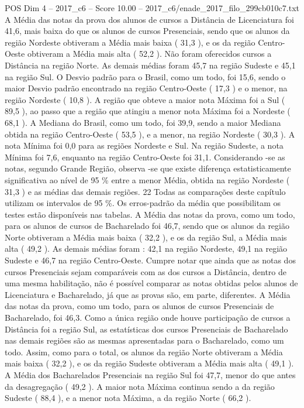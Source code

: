 \begin{textsample}{POS Dim 4 – 2017\_c6 – Score 10.00 – 2017\_c6/enade\_2017\_filo\_299cb010c7.txt}
A Média das notas da prova dos alunos de cursos a Distância de Licenciatura foi 41,6, mais baixa do que os alunos de cursos Presenciais, sendo que os alunos da região Nordeste obtiveram a Média mais baixa ( 31,3 ), e os da região Centro-Oeste obtiveram a Média mais alta ( 52,2 ).
Não foram oferecidos cursos a Distância na região Norte.
As demais médias foram 45,7 na região Sudeste e 45,1 na região Sul.
O Desvio padrão para o Brasil, como um todo, foi 15,6, sendo o maior Desvio padrão encontrado na região Centro-Oeste ( 17,3 ) e o menor, na região Nordeste ( 10,8 ).
A região que obteve a maior nota Máxima foi a Sul ( 89,5 ), ao passo que a região que atingiu a menor nota Máxima foi a Nordeste ( 68,1 ).
A Mediana do Brasil, como um todo, foi 39,9, sendo a maior Mediana obtida na região Centro-Oeste ( 53,5 ), e a menor, na região Nordeste ( 30,3 ).
A nota Mínima foi 0,0 para as regiões Nordeste e Sul.
Na região Sudeste, a nota Mínima foi 7,6, enquanto na região Centro-Oeste foi 31,1.
Considerando -se as notas, segundo Grande Região, observa -se que existe diferença estatisticamente significativa ao nível de 95 \% entre a menor Média, obtida na região Nordeste ( 31,3 ) e as médias das demais regiões. 22 Todas as comparações deste capítulo utilizam os intervalos de 95 \%.
Os erros-padrão da média que possibilitam os testes estão disponíveis nas tabelas.
A Média das notas da prova, como um todo, para os alunos de cursos de Bacharelado foi 46,7, sendo que os alunos da região Norte obtiveram a Média mais baixa ( 32,2 ), e os da região Sul, a Média mais alta ( 49,2 ).
As demais médias foram : 42,1 na região Nordeste, 49,1 na região Sudeste e 46,7 na região Centro-Oeste.
Cumpre notar que ainda que as notas dos cursos Presenciais sejam comparáveis com as dos cursos a Distância, dentro de uma mesma habilitação, não é possível comparar as notas obtidas pelos alunos de Licenciatura e Bacharelado, já que as provas são, em parte, diferentes.
A Média das notas da prova, como um todo, para os alunos de cursos Presenciais de Bacharelado, foi 46,3.
Como a única região onde houve participação de cursos a Distância foi a região Sul, as estatísticas dos cursos Presenciais de Bacharelado nas demais regiões são as mesmas apresentadas para o Bacharelado, como um todo.
Assim, como para o total, os alunos da região Norte obtiveram a Média mais baixa ( 32,2 ), e os da região Sudeste obtiveram a Média mais alta ( 49,1 ).
A Média dos Bacharelados Presenciais na região Sul foi 47,7, menor do que antes da desagregação ( 49,2 ).
A maior nota Máxima continua sendo a da região Sudeste ( 88,4 ), e a menor nota Máxima, a da região Norte ( 66,2 ).

\end{textsample}
